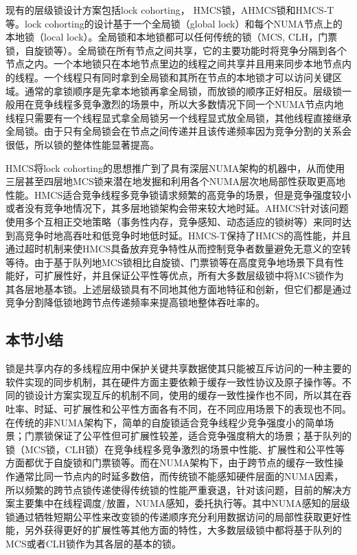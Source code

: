 现有的层级锁设计方案包括lock cohorting\cite{dice2012lock}， HMCS锁\cite{chabbi2015high}，AHMCS锁\cite{chabbi2016contention}和HMCS-T\cite{chabbi2017efficient}等。lock cohorting的设计基于一个全局锁（global lock）和每个NUMA节点上的本地锁（local lock）。全局锁和本地锁都可以任何传统的锁（MCS, CLH，门票锁，自旋锁等）。全局锁在所有节点之间共享，它的主要功能时将竞争分隔到各个节点之内。一个本地锁只在本地节点里边的线程之间共享并且用来同步本地节点内的线程。一个线程只有同时拿到全局锁和其所在节点的本地锁才可以访问关键区域。通常的拿锁顺序是先拿本地锁再拿全局锁，而放锁的顺序正好相反。层级锁一般用在竞争线程多竞争激烈的场景中，所以大多数情况下同一个NUMA节点内地线程只需要有一个线程显式拿全局锁另一个线程显式放全局锁，其他线程直接继承全局锁。由于只有全局锁会在节点之间传递并且该传递频率因为竞争分割的关系会很低，所以锁的整体性能显著提高。

HMCS将lock cohorting的思想推广到了具有深层NUMA架构的机器中，从而使用三层甚至四层地MCS锁来潜在地发掘和利用各个NUMA层次地局部性获取更高地性能。HMCS适合竞争线程多竞争锁请求频繁的高竞争的场景，但是竞争强度较小或者没有竞争地情况下，其多层地锁架构会带来较大地时延。AHMCS针对该问题使用多个互相正交地策略（事务性内存，竞争感知、动态适应的锁树等）来同时达到高竞争时地高吞吐和低竞争时地低时延。HMCS-T保持了HMCS的高性能，并且通过超时机制来使HMCS具备放弃竞争特性从而控制竞争者数量避免无意义的空转等待。由于基于队列地MCS锁相比自旋锁、门票锁等在高度竞争地场景下具有性能好，可扩展性好，并且保证公平性等优点，所有大多数层级锁中将MCS锁作为其各层地基本锁。上述层级锁具有不同地其他方面地特征和创新，但它们都是通过竞争分割降低锁地跨节点传递频率来提高锁地整体吞吐率的。

\subsection{本节小结}
锁是共享内存的多线程应用中保护关键共享数据使其只能被互斥访问的一种主要的软件实现的同步机制，其在硬件方面主要依赖于缓存一致性协议及原子操作等。不同的锁设计方案实现互斥的机制不同，使用的缓存一致性操作也不同，所以其在吞吐率、时延、可扩展性和公平性方面各有不同，在不同应用场景下的表现也不同。在传统的非NUMA架构下，简单的自旋锁适合竞争线程少竞争强度小的简单场景；门票锁保证了公平性但可扩展性较差，适合竞争强度稍大的场景；基于队列的锁（MCS锁，CLH锁）在竞争线程多竞争激烈的场景中性能、扩展性和公平性等方面都优于自旋锁和门票锁等。而在NUMA架构下，由于跨节点的缓存一致性操作通常比同一节点内的时延多数倍，而传统锁不能感知硬件层面的NUMA因素，所以频繁的跨节点锁传递使得传统锁的性能严重衰退，针对该问题，目前的解决方案主要集中在线程调度/放置，NUMA感知，委托执行等。其中NUMA感知的层级锁通过牺牲短期公平性来改变锁的传递顺序充分利用数据访问的局部性获取更好性能，另外获得更好的扩展性等其他方面的特性，大多数层级锁中都将基于队列的MCS或者CLH锁作为其各层的基本的锁。
